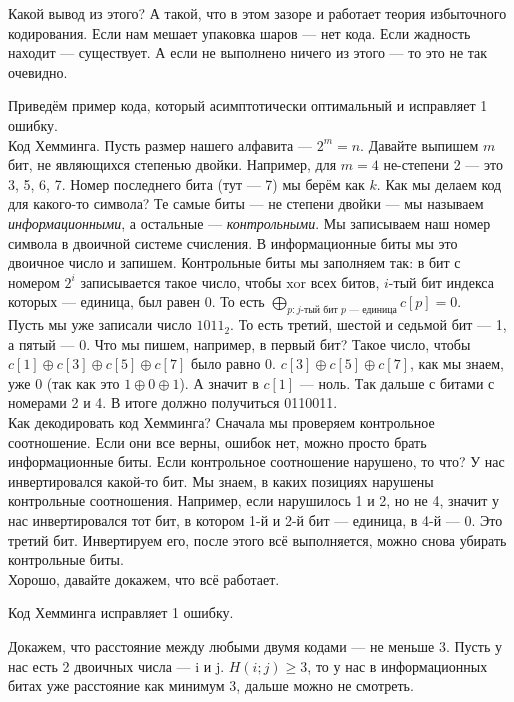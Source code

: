 \documentclass{article}
\begin{document}
\begin{itemize}
\begin{Comment}
            Какой вывод из этого? А такой, что в этом зазоре и работает теория избыточного кодирования. Если нам мешает упаковка шаров --- нет кода. Если жадность находит --- существует. А если не выполнено ничего из этого --- то это не так очевидно.
        \end{Comment}
        \begin{Comment}
            Приведём пример кода, который асимптотически оптимальный и исправляет 1 ошибку.\\
            Код Хемминга. Пусть размер нашего алфавита --- $2^m=n$. Давайте выпишем $m$ бит, не являющихся степенью двойки. Например, для $m=4$ не-степени 2 --- это 3, 5, 6, 7. Номер последнего бита (тут --- 7) мы берём как $k$. Как мы делаем код для какого-то символа? Те самые биты --- не степени двойки --- мы называем \textit{информационными}, а остальные --- \textit{контрольными}. Мы записываем наш номер символа в двоичной системе счисления. В информационные биты мы это двоичное число и запишем. Контрольные биты мы заполняем так: в бит с номером $2^i$ записывается такое число, чтобы $\mathrm{xor}$ всех битов, $i$-тый бит индекса которых --- единица, был равен 0. То есть $\bigoplus\limits_{p:j\text{-тый бит }p\text{ --- единица}}c[p]=0$.\\
            Пусть мы уже записали число $1011_2$. То есть третий, шестой и седьмой бит --- 1, а пятый --- 0. Что мы пишем, например, в первый бит? Такое число, чтобы $c[1]\oplus c[3]\oplus c[5]\oplus c[7]$ было равно 0. $c[3]\oplus c[5]\oplus c[7]$, как мы знаем, уже 0 (так как это $1\oplus0\oplus1$). А значит в $c[1]$ --- ноль. Так дальше с битами с номерами 2 и 4. В итоге должно получиться 0110011.\\
            Как декодировать код Хемминга? Сначала мы проверяем контрольное соотношение. Если они все верны, ошибок нет, можно просто брать информационные биты. Если контрольное соотношение нарушено, то что? У нас инвертировался какой-то бит. Мы знаем, в каких позициях нарушены контрольные соотношения. Например, если нарушилось 1 и 2, но не 4, значит у нас инвертировался тот бит, в котором 1-й и 2-й бит --- единица, в 4-й --- 0. Это третий бит. Инвертируем его, после этого всё выполняется, можно снова убирать контрольные биты.\\
            Хорошо, давайте докажем, что всё работает.
        \end{Comment}
        \thm Код Хемминга исправляет 1 ошибку.
        \begin{Proof}
            Докажем, что расстояние между любыми двумя кодами --- не меньше 3. Пусть у нас есть 2 двоичных числа --- i и j. $H(i;j)\geqslant3$, то у нас в информационных битах уже расстояние как минимум 3, дальше можно не смотреть.\\

\end{Proof}
\end{itemize}
\end{document}
